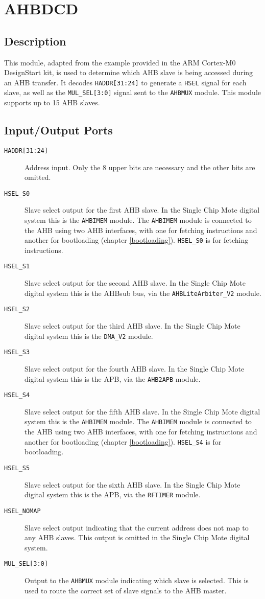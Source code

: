 \section{AHBDCD} \label{ahbdcd}
\subsection{Description}
This module, adapted from the example provided in the ARM Cortex-M0 DesignStart kit, is used to determine which AHB slave is being accessed during an AHB transfer. It decodes \texttt{HADDR[31:24]} to generate a \texttt{HSEL} signal for each slave, as well as the \texttt{MUL\_SEL[3:0]} signal sent to the \texttt{AHBMUX} module. This module supports up to 15 AHB slaves.

\subsection{Input/Output Ports}
\begin{description}
	\item[\texttt{HADDR[31:24]}] Address input. Only the 8 upper bits are necessary and the other bits are omitted.
	\item[\texttt{HSEL\_S0}] Slave select output for the first AHB slave. In the Single Chip Mote digital system this is the \texttt{AHBIMEM} module. The \texttt{AHBIMEM} module is connected to the AHB using two AHB interfaces, with one for fetching instructions and another for bootloading (chapter \ref{bootloading}). \texttt{HSEL\_S0} is for fetching instructions.
	\item[\texttt{HSEL\_S1}] Slave select output for the second AHB slave. In the Single Chip Mote digital system this is the AHBsub bus, via the \texttt{AHBLiteArbiter\_V2} module.
	\item[\texttt{HSEL\_S2}] Slave select output for the third AHB slave. In the Single Chip Mote digital system this is the \texttt{DMA\_V2} module.
	\item[\texttt{HSEL\_S3}] Slave select output for the fourth AHB slave. In the Single Chip Mote digital system this is the APB, via the \texttt{AHB2APB} module.
	\item[\texttt{HSEL\_S4}] Slave select output for the fifth AHB slave. In the Single Chip Mote digital system this is the \texttt{AHBIMEM} module. The \texttt{AHBIMEM} module is connected to the AHB using two AHB interfaces, with one for fetching instructions and another for bootloading (chapter \ref{bootloading}). \texttt{HSEL\_S4} is for bootloading.
	\item[\texttt{HSEL\_S5}] Slave select output for the sixth AHB slave. In the Single Chip Mote digital system this is the APB, via the \texttt{RFTIMER} module.
	\item[\texttt{HSEL\_NOMAP}] Slave select output indicating that the current address does not map to any AHB slaves. This output is omitted in the Single Chip Mote digital system.
	\item[\texttt{MUL\_SEL[3:0]}] Output to the \texttt{AHBMUX} module indicating which slave is selected. This is used to route the correct set of slave signals to the AHB master.
\end{description}

